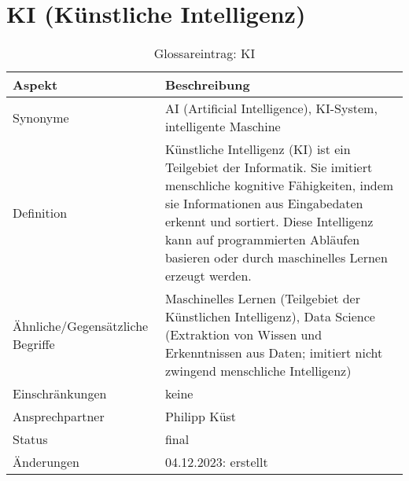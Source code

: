 \section*{KI (Künstliche Intelligenz)}\label{sec:glossar_ki}
\begin{table}[H]
    \label{tab:glossar_ki}
    \begin{tabularx}{\textwidth}{|l|X|}
        \hline
        \textbf{Aspekt}                  & \textbf{Beschreibung}                                                                                                                                                           \\
        \hline
        Synonyme                         & AI (Artificial Intelligence), KI-System, intelligente Maschine                                                                                                                  \\
        \hline
        Definition & Künstliche Intelligenz (KI) ist ein Teilgebiet der Informatik.
        Sie imitiert menschliche kognitive Fähigkeiten, indem sie Informationen aus Eingabedaten erkennt und sortiert.
        Diese Intelligenz kann auf programmierten Abläufen basieren oder durch maschinelles Lernen erzeugt werden. \\
        \hline
        Ähnliche/Gegensätzliche Begriffe & Maschinelles Lernen (Teilgebiet der Künstlichen Intelligenz), Data Science (Extraktion von Wissen und Erkenntnissen aus Daten; imitiert nicht zwingend menschliche Intelligenz) \\
        \hline
        Einschränkungen                  & keine                                                                                                                                                                           \\
        \hline
        Ansprechpartner                  & Philipp Küst                                                                                                                                                                    \\
        \hline
        Status                           & final                                                                                                                                                                           \\
        \hline
        Änderungen                       & 04.12.2023: erstellt                                                                                                                                                            \\
        \hline
    \end{tabularx}
    \caption{Glossareintrag: KI}
\end{table}


